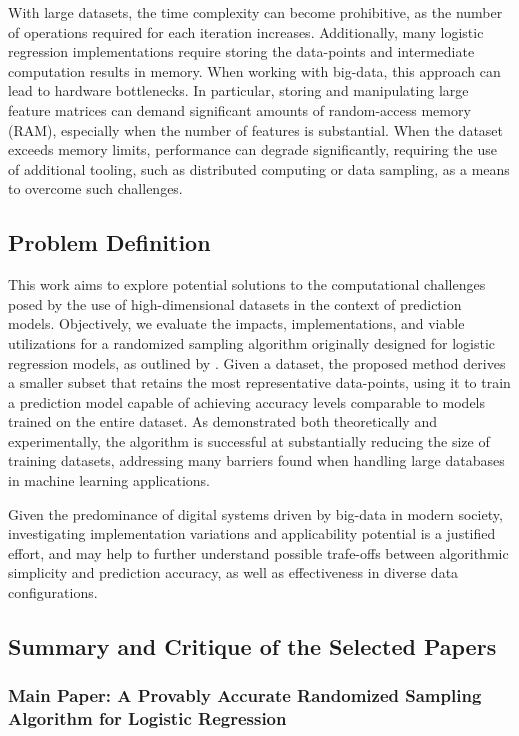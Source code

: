 \documentclass{article}
\theoremstyle{plain}
\theoremstyle{definition}
\theoremstyle{remark}
\begin{document}
With large datasets, the time complexity can become prohibitive, as the number of operations required for each iteration increases. Additionally, many logistic regression implementations require storing the data-points and intermediate computation results in memory. When working with big-data, this approach can lead to hardware bottlenecks. In particular, storing and manipulating large feature matrices can demand significant amounts of random-access memory (RAM), especially when the number of features is substantial. When the dataset exceeds memory limits, performance can degrade significantly, requiring the use of additional tooling, such as distributed computing or data sampling, as a means to overcome such challenges.

\subsection{Problem Definition}

This work aims to explore potential solutions to the computational challenges posed by the use of high-dimensional datasets in the context of prediction models. Objectively, we evaluate the impacts, implementations, and viable utilizations for a randomized sampling algorithm originally designed for logistic regression models, as outlined by \citet{chow24}. Given a dataset, the proposed method derives a smaller subset that retains the most representative data-points, using it to train a prediction model capable of achieving accuracy levels comparable to models trained on the entire dataset. As demonstrated both theoretically and experimentally, the algorithm is successful at substantially reducing the size of training datasets, addressing many barriers found when handling large databases in machine learning applications.

Given the predominance of digital systems driven by big-data in modern society, investigating implementation variations and applicability potential is a justified effort, and may help to further understand possible trafe-offs between algorithmic simplicity and prediction accuracy, as well as effectiveness in diverse data configurations.


\subsection{Summary and Critique of the Selected Papers}

\subsubsection{Main Paper: A Provably Accurate Randomized Sampling Algorithm for Logistic Regression \cite{chow24}}
\end{document}
